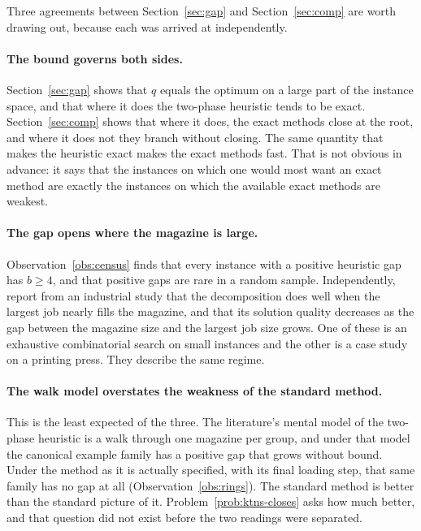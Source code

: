 Three agreements between Section~\ref{sec:gap} and Section~\ref{sec:comp} are worth
drawing out, because each was arrived at independently.

\paragraph{The bound governs both sides.}
Section~\ref{sec:gap} shows that $q$ equals the optimum on a large part of the
instance space, and that where it does the two-phase heuristic tends to be exact.
Section~\ref{sec:comp} shows that where it does, the exact methods close at the root,
and where it does not they branch without closing. The same quantity that makes the
heuristic exact makes the exact methods fast. That is not obvious in advance: it says
that the instances on which one would most want an exact method are exactly the
instances on which the available exact methods are weakest.

\paragraph{The gap opens where the magazine is large.}
Observation~\ref{obs:census} finds that every instance with a positive heuristic gap
has $b\ge4$, and that positive gaps are rare in a random sample. Independently,
\citet{Burger2015} report from an industrial study that the decomposition does well
when the largest job nearly fills the magazine, and that its solution quality
decreases as the gap between the magazine size and the largest job size grows. One of
these is an exhaustive combinatorial search on small instances and the other is a case
study on a printing press. They describe the same regime.

\paragraph{The walk model overstates the weakness of the standard method.}
This is the least expected of the three. The literature's mental model of the
two-phase heuristic is a walk through one magazine per group, and under that model the
canonical example family has a positive gap that grows without bound. Under the method
as it is actually specified, with its final loading step, that same family has no gap
at all (Observation~\ref{obs:rings}). The standard method is better than the standard
picture of it. Problem~\ref{prob:ktns-closes} asks how much better, and that question
did not exist before the two readings were separated.

